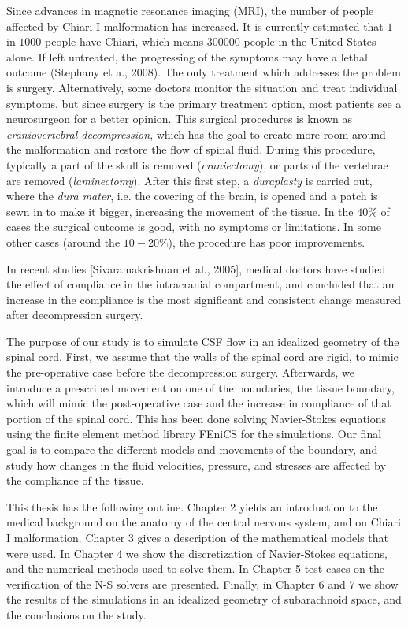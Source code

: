 \documentclass[a4paper,11pt,openright,twoside]{book}
\begin{document}
Since advances in magnetic resonance imaging (MRI), the number of people affected by Chiari I malformation has increased. It is currently estimated that $1$ in $1000$ people have Chiari, which means $300000$ people in the United States alone. If left untreated, the progressing of the symptoms may have a lethal outcome (Stephany et a., 2008). The only treatment which addresses the problem is surgery. Alternatively, some doctors monitor the situation and treat individual symptoms, but since surgery is the primary treatment option, most patients see a neurosurgeon for a better opinion. This surgical procedures is known as \textit{craniovertebral decompression}, which has the goal to create more room around the malformation and restore the flow of spinal fluid. During this procedure, typically a part of the skull is removed (\textit{craniectomy}), or parts of the vertebrae are removed (\textit{laminectomy}). After this first step, a \textit{duraplasty} is carried out, where the \textit{dura mater}, i.e. the covering of the brain, is opened and a patch is sewn in to make it bigger, increasing the movement of the tissue.
In the $40 \%$ of cases the surgical outcome is good, with no symptoms or limitations. In some other cases (around the $10-20 \%$), the procedure has poor improvements. 

In recent studies [Sivaramakrishnan et al., 2005], medical doctors have studied the effect of compliance in the intracranial compartment, and concluded that an increase in the compliance is the most significant and consistent change measured after decompression surgery. 

The purpose of our study is to simulate CSF flow in an idealized geometry of the spinal cord. First, we assume that the walls of the spinal cord are rigid, to mimic the pre-operative case before the decompression surgery.  Afterwards, we introduce a prescribed movement on one of the boundaries, the tissue boundary, which will mimic the post-operative case and the increase in compliance of that portion of the spinal cord. This has been done solving Navier-Stokes equations using the finite element method library FEniCS for the simulations. Our final goal is to compare the different models and movements of the boundary, and study how changes in the fluid velocities, pressure, and stresses are affected by the compliance of the tissue. 

This thesis has the following outline. Chapter 2 yields an introduction to the medical background on the anatomy of the central nervous system, and on Chiari I malformation. Chapter 3 gives a description of the mathematical models that were used. In Chapter 4 we show the discretization of Navier-Stokes equations, and the numerical methods used to solve them. In Chapter 5 test cases on the verification of the N-S solvers are presented. Finally, in Chapter 6 and 7 we show the results of the simulations in an idealized geometry of subarachnoid space, and the conclusions on the study.
\end{document}
